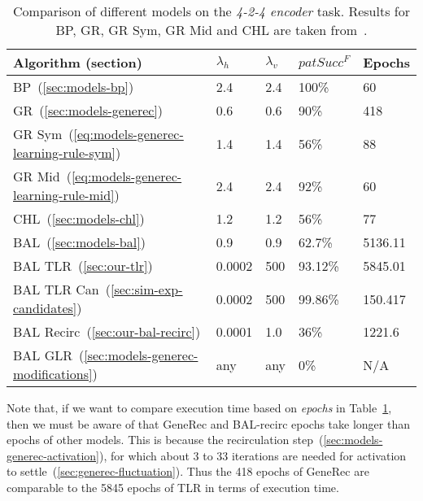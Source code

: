 \begin{table}[H] 
  \centering
    \begin{tabular}{|l|l|l|l|l|}
    \hline
    Algorithm (section)&$\lambda_h$&$\lambda_v$&$patSucc^F$ &Epochs\\ %
    \hline
    BP~(\ref{sec:models-bp}) &2.4 &2.4 &100\%&60\\ %
    \hline
    GR~(\ref{sec:models-generec}) &0.6 &0.6 &90\%&418\\ %
    \hline
    GR Sym~(\ref{eq:models-generec-learning-rule-sym}) &1.4 &1.4 &56\%&88\\ %
    \hline
    GR Mid~(\ref{eq:models-generec-learning-rule-mid}) &2.4 &2.4 &92\%&60\\ %
    \hline
    CHL~(\ref{sec:models-chl}) &1.2 &1.2 &56\%&77\\ %
    \hline
    BAL~(\ref{sec:models-bal})&0.9 &0.9 &62.7\%& 5136.11\\ %
    \hline
    BAL TLR~(\ref{sec:our-tlr})&0.0002  & 500&93.12\%&5845.01\\ %
    \hline
    BAL TLR Can~(\ref{sec:sim-exp-candidates})&0.0002&500&99.86\%&150.417\\ %
    \hline
    BAL Recirc~(\ref{sec:our-bal-recirc})&0.0001&1.0&36\%&1221.6\\ %
    \hline
    BAL GLR~(\ref{sec:models-generec-modifications})& any & any & 0\% & N/A \\
    \hline 
    \end{tabular}
  \caption{Comparison of different models on the \emph{4-2-4 encoder} task. Results for BP, GR, GR Sym, GR Mid and CHL are taken from~\citet{o1996bio}.} 
  \label{tab:results-cmp-auto4}
\end{table}

Note that, if we want to compare execution time based on \emph{epochs} in Table~\ref{tab:results-cmp-auto4}, then we must be aware of that GeneRec and BAL-recirc epochs take longer than epochs of other models. This is because the recirculation step~(\ref{sec:models-generec-activation}), for which about 3 to 33 iterations are needed for activation to settle~(\ref{sec:generec-fluctuation}). Thus the 418 epochs of GeneRec are comparable to the 5845 epochs of TLR in terms of execution time. 

